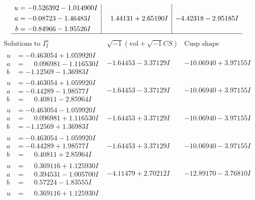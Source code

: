 \documentclass[1p]{elsarticle_modified}
\theoremstyle{definition}
\newcommand{\I}{\sqrt{-1}}
\begin{document}
$$\begin{array}{c|c|c}
\begin{aligned}
u &= -0.526392 - 1.014900 I \\
a &= -0.08723 - 1.46483 I \\
b &= -0.84966 - 1.95526 I\end{aligned}
 & \phantom{-}1.44131 + 2.65190 I & -4.42318 - 2.95185 I\\
 \hline 
 \end{array}$$\newpage$$\begin{array}{c|c|c}  
\text{Solutions to }I^u_{2}& \I (\text{vol} + \sqrt{-1}CS) & \text{Cusp shape}\\
 \hline 
\begin{aligned}
u &= -0.463054 + 1.059920 I \\
a &= \phantom{-}0.096981 - 1.116530 I \\
b &= -1.12569 - 1.36983 I\end{aligned}
 & -1.64453 - 3.37129 I & -10.06940 + 3.97155 I \\ \hline\begin{aligned}
u &= -0.463054 + 1.059920 I \\
a &= -0.44289 - 1.98577 I \\
b &= \phantom{-}0.40811 - 2.85964 I\end{aligned}
 & -1.64453 - 3.37129 I & -10.06940 + 3.97155 I \\ \hline\begin{aligned}
u &= -0.463054 - 1.059920 I \\
a &= \phantom{-}0.096981 + 1.116530 I \\
b &= -1.12569 + 1.36983 I\end{aligned}
 & -1.64453 + 3.37129 I & -10.06940 - 3.97155 I \\ \hline\begin{aligned}
u &= -0.463054 - 1.059920 I \\
a &= -0.44289 + 1.98577 I \\
b &= \phantom{-}0.40811 + 2.85964 I\end{aligned}
 & -1.64453 + 3.37129 I & -10.06940 - 3.97155 I \\ \hline\begin{aligned}
u &= \phantom{-}0.369116 + 1.125930 I \\
a &= \phantom{-}0.394531 - 1.005700 I \\
b &= \phantom{-}0.57224 - 1.83555 I\end{aligned}
 & -4.11479 + 2.70212 I & -12.89170 - 3.76810 I \\ \hline\begin{aligned}
u &= \phantom{-}0.369116 + 1.125930 I \\

\end{aligned}
\end{array}$$
\end{document}
